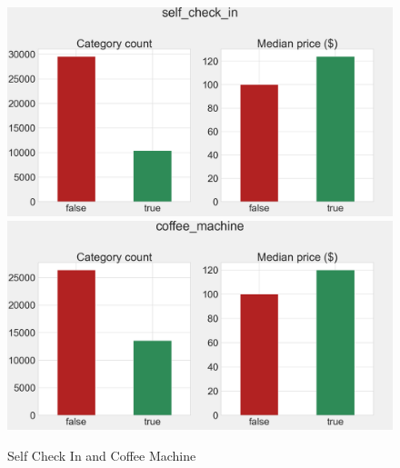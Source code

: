 \begin{figure}[H]
\centering
\caption{Self Check In and Coffee Machine}
    \includegraphics[width=\linewidth]{figures/amenities/group1/self_checkin.png}
    \vspace{0.5cm}
    \includegraphics[width=\linewidth]{figures/amenities/group1/coffee_machine.png}
    \label{fig:self-checkin-and-coffee-machine}
\end{figure}

